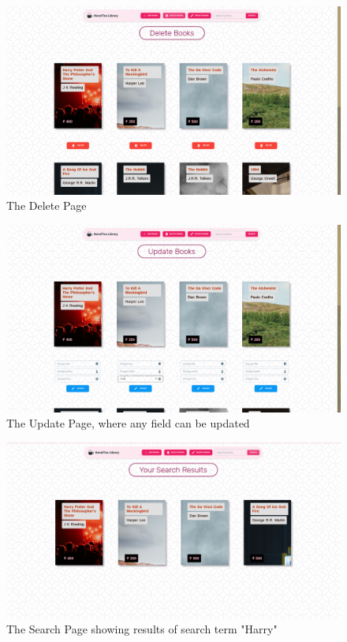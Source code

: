 \documentclass[11pt]{article}
\begin{document}
\begin{figure}[H]
    \centering
    \includegraphics[width=.95\textwidth]{screenshots/delete.png}
    \caption{The Delete Page}
\end{figure}
\begin{figure}[H]

    \centering
    \includegraphics[width=.95\textwidth]{screenshots/update.png}
    \caption{The Update Page, where any field can be updated}
\end{figure}

\begin{figure}[H]
    \centering
    \includegraphics[width=.95\textwidth]{screenshots/search.png}
    \caption{The Search Page showing results of search term "Harry"}
\end{figure}
\end{document}
